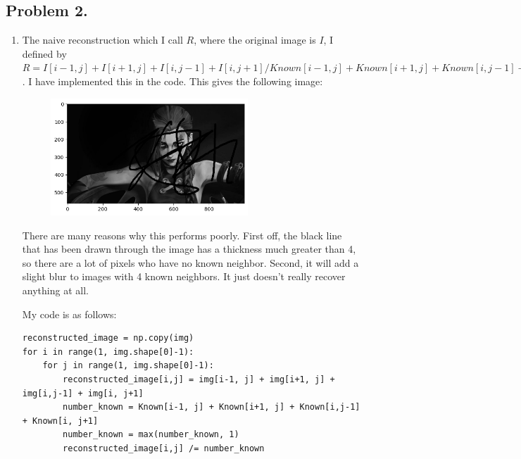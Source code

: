 \documentclass[12pt]{article}
\begin{document}
    \subsection*{Problem 2.}
    \begin{enumerate}[label=(\alph*)]
        \item The naive reconstruction which I call $R$, where the original image is $I$, I defined by $R = I[i-1,j] + I[i+1,j] + I[i,j-1] + I[i,j+1] / Known[i-1,j] + Known[i+1,j] + Known[i,j-1] + Known[i,j+1]$. I have implemented this in the code. This gives the following image:
        \begin{figure}[H]
            \centering
            \includegraphics[width=0.7\textwidth]{naive_reconstruction.png}
        \end{figure}
        There are many reasons why this performs poorly. First off, the black line that has been drawn through the image has a thickness much greater than 4, so there are a lot of pixels who have no known neighbor. Second, it will add a slight blur to images with 4 known neighbors. It just doesn't really recover anything at all.

        My code is as follows:
        \begin{lstlisting}
reconstructed_image = np.copy(img)
for i in range(1, img.shape[0]-1):
    for j in range(1, img.shape[0]-1):
        reconstructed_image[i,j] = img[i-1, j] + img[i+1, j] + img[i,j-1] + img[i, j+1]
        number_known = Known[i-1, j] + Known[i+1, j] + Known[i,j-1] + Known[i, j+1]
        number_known = max(number_known, 1)
        reconstructed_image[i,j] /= number_known
        \end{lstlisting}


\end{enumerate}
\end{document}
